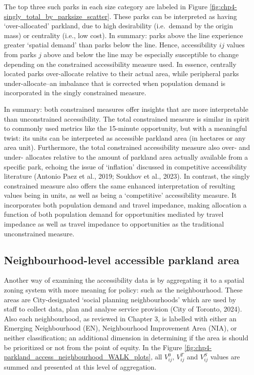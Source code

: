 \documentclass[
11pt, %
oneside, %
english, %
singlespacing, %
]{macthesis} %
\begin{document}
The top three such parks in each size category are labeled in Figure \ref{fig:chp4-singly_total_by_parksize_scatter}. These parks can be interpreted as having `over-allocated' parkland, due to high desirability (i.e.~demand by the origin mass) or centrality (i.e., low cost). In summary: parks above the line experience greater `spatial demand' than parks below the line. Hence, accessibility \(ij\) values from parks \(j\) above and below the line may be especially susceptible to change depending on the constrained accessibility measure used. In essence, centrally located parks over-allocate relative to their actual area, while peripheral parks under-allocate--an imbalance that is corrected when population demand is incorporated in the singly constrained measure.

In summary: both constrained measures offer insights that are more interpretable than unconstrained accessibility. The total constrained measure is similar in spirit to commonly used metrics like the 15-minute opportunity, but with a meaningful twist: its units can be interpreted as accessible parkland area (in hectares or any area unit). Furthermore, the total constrained accessibility measure also over- and under- allocates relative to the amount of parkland area actually available from a specific park, echoing the issue of `inflation' discussed in competitive accessibility literature (Antonio Paez et al., 2019; Soukhov et al., 2023). In contrast, the singly constrained measure also offers the same enhanced interpretation of resulting values being in units, as well as being a `competitive' accessibility measure. It incorporates both population demand and travel impedance, making allocation a function of both population demand for opportunities mediated by travel impedance as well as travel impedance to opportunities as the traditional unconstrained measure.

\subsection{Neighbourhood-level accessible parkland area}\label{neighbourhood-level-accessible-parkland-area}

Another way of examining the accessibility data is by aggregating it to a spatial zoning system with more meaning for policy: such as the neighbourhood. These areas are City-designated `social planning neighbourhoods' which are used by staff to collect data, plan and analyse service provision (City of Toronto, 2024). Also each neighbourhood, as reviewed in Chapter 3, is labelled with either an Emerging Neighbourhood (EN), Neighbourhood Improvement Area (NIA), or neither classification; an additional dimension in determining if the area is should be prioritized or not from the point of equity. In the Figure \ref{fig:chp4-parkland_access_neighbourhood_WALK_plots}, all \(V^0_{ij}\), \(V^T_{ij}\) and \(V^S_{ij}\) values are summed and presented at this level of aggregation.
\end{document}
